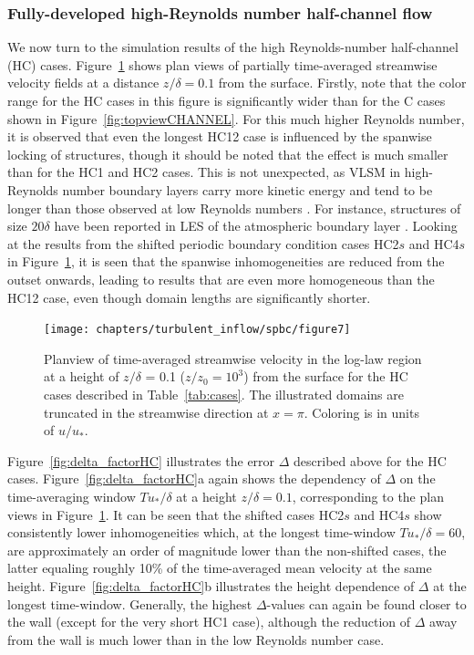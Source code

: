 		\subsubsection{Fully-developed high-Reynolds number half-channel flow}
		We now turn to the simulation results of the high Reynolds-number half-channel (HC) cases. Figure~\ref{fig:topviewHC} shows plan views of partially time-averaged streamwise velocity fields at a distance $z/\delta = 0.1$ from the surface. Firstly, note that the color range for the HC cases in this figure is significantly wider than for the C cases shown in Figure~\ref{fig:topviewCHANNEL}. For this much higher Reynolds number, it is observed that even the longest HC12 case is influenced by the spanwise locking of structures, though it should be noted that the effect is much smaller than for the HC1 and HC2 cases. This is not unexpected, as VLSM in high-Reynolds number boundary layers carry more kinetic energy and tend to be longer than those observed at low Reynolds numbers \citep{balakumar2007large,hutchins2007evidence,hutchins2007large}. For instance, structures of size $20\delta$ have been reported in LES of the atmospheric boundary layer \citep{fang2015large}.
		Looking at the results from the shifted periodic boundary condition cases HC2$s$ and HC4$s$ in Figure~\ref{fig:topviewHC}, it is seen that the spanwise inhomogeneities are reduced from the outset onwards, leading to results that are even more homogeneous than the HC12 case, even though domain lengths are significantly shorter. 
		
		\begin{figure}
						\centering
			\texttt{[image: chapters/turbulent\_inflow/spbc/figure7]}
			\caption{Planview of time-averaged streamwise velocity in the log-law region at a height of $z/\delta$ = 0.1 ($z/z_0 = 10^3$) from the surface for the HC cases described in Table~\ref{tab:cases}. The illustrated domains are truncated in the streamwise direction at $x = \pi$. Coloring is in units of  $u/u_*$.}
			\label{fig:topviewHC}
		\end{figure}
		
		Figure~\ref{fig:delta_factorHC} illustrates the error $\Delta$ described above for the HC cases. Figure~\ref{fig:delta_factorHC}a again shows the dependency of $\Delta$ on the time-averaging window $Tu_*/\delta$ at a height $z/\delta = 0.1$, corresponding to the plan views in Figure~\ref{fig:topviewHC}. It can be seen that the shifted cases HC2$s$ and HC4$s$ show consistently lower inhomogeneities which, at the longest time-window $Tu_*/\delta = 60$, are approximately an order of magnitude lower than the non-shifted cases, the latter equaling roughly 10\% of the time-averaged mean velocity at the same height. Figure~\ref{fig:delta_factorHC}b illustrates the height dependence of $\Delta$ at the longest time-window. Generally, the highest $\Delta$-values can again be found closer to the wall (except for the very short HC1 case), although the reduction of $\Delta$ away from the wall is much lower than in the low Reynolds number case. 
		
